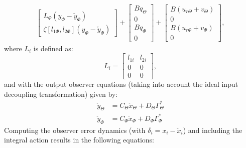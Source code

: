 \documentclass[../main.tex]{subfiles}
\begin{document}
\begin{align}
\begin{bmatrix}
	L_{\Phi}(y_{\Phi} - \check{y}_{\Phi}) \\
	\zeta[l_{1\Phi},l_{2{\Phi}}](y_\Phi - \check{y}_\Phi)
	\end{bmatrix} +
	\begin{bmatrix}
		Bq_\Theta \\
		0 \\
		Bq_\Phi \\
		0	
	\end{bmatrix} +
	\begin{bmatrix}
	B(u_{r\Theta} + v_\Theta)\\
	0 \\
	B(u_{r\Phi} + v_\Phi) \\
	0
	\end{bmatrix},
	\end{align}	
	where $L_i$ is defined as:
	\begin{equation}
		L_i = \begin{bmatrix}
		l_{1i} & l_{2i} \\
		0 & 0 \\
		0 & 0 
		\end{bmatrix},
	\end{equation}	
	and with the output observer equations (taking into account the ideal input decoupling transformation) given by:		
	\begin{align}
		\check{y}_\Theta &= C_\Theta \check{x}_\Theta + D_\Theta \Gamma_\Theta^* \\
		\check{y}_\Phi &= C_\Phi \check{x}_\Phi + D_\Phi \Gamma_\Phi^*		
	\end{align}	
	Computing the observer error dynamics (with $\delta_i = x_i - \check{x}_i$) and including the integral action results in the following equations:	
\end{document}
